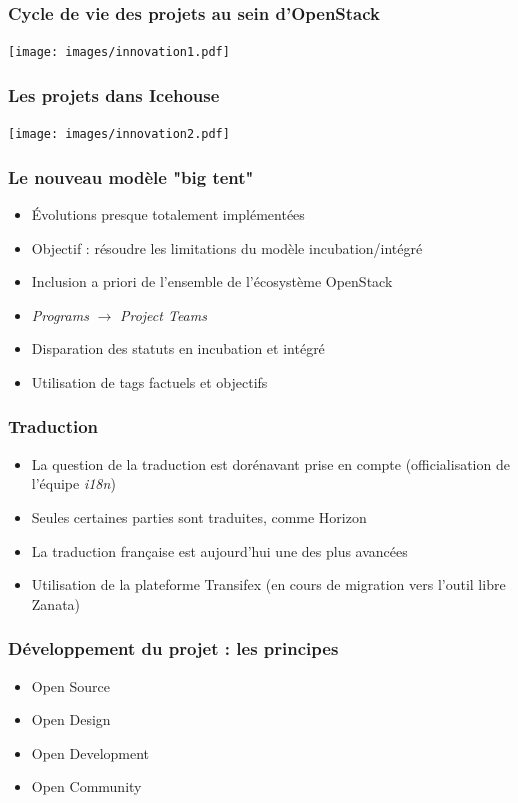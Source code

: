   \begin{frame}
    \frametitle{Cycle de vie des projets au sein d'OpenStack}
    \texttt{[image: images/innovation1.pdf]}
  \end{frame}

  \begin{frame}
    \frametitle{Les projets dans Icehouse}
    \texttt{[image: images/innovation2.pdf]}
  \end{frame}

  \begin{frame}
    \frametitle{Le nouveau modèle "big tent"}
    \begin{itemize}
      \item Évolutions presque totalement implémentées
      \item Objectif : résoudre les limitations du modèle incubation/intégré
      \item Inclusion {a priori} de l'ensemble de l'écosystème OpenStack
      \item \textit{Programs} $\rightarrow$ \textit{Project Teams}
      \item Disparation des statuts en incubation et intégré
      \item Utilisation de tags factuels et objectifs
    \end{itemize}
  \end{frame}

  \begin{frame}
    \frametitle{Traduction}
    \begin{itemize}
      \item La question de la traduction est dorénavant prise en compte (officialisation de l'équipe \textit{i18n})
      \item Seules certaines parties sont traduites, comme Horizon
      \item La traduction française est aujourd'hui une des plus avancées
      \item Utilisation de la plateforme Transifex (en cours de migration vers l'outil libre Zanata)
    \end{itemize}
  \end{frame}

  \begin{frame}
    \frametitle{Développement du projet : les principes}
    \begin{itemize}
      \item Open Source
      \item Open Design
      \item Open Development
      \item Open Community
    \end{itemize}
  \end{frame}

